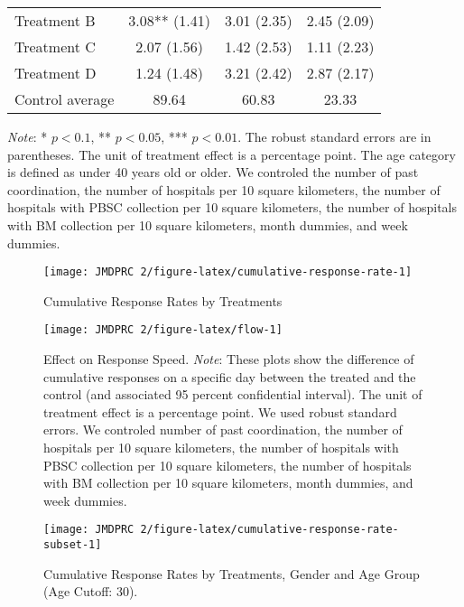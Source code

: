 \documentclass[12pt, a4paper]{article}
\begin{document}
\begin{table}[H]
\begin{threeparttable}
\begin{tabular}[t]{lccc}
\hspace{1em}Treatment B & 3.08** (1.41) & 3.01 (2.35) & 2.45 (2.09)\\
\hspace{1em}Treatment C & 2.07 (1.56) & 1.42 (2.53) & 1.11 (2.23)\\
\hspace{1em}Treatment D & 1.24 (1.48) & 3.21 (2.42) & 2.87 (2.17)\\
\hspace{1em}Control average & 89.64 & 60.83 & 23.33\\
\bottomrule
\end{tabular}
\begin{tablenotes}
\item \emph{Note}: * $p < 0.1$, ** $p < 0.05$, *** $p < 0.01$. The robust standard errors are in parentheses. The unit of treatment effect is a percentage point. The age category is defined as under 40 years old or older. We controled the number of past coordination, the number of hospitals per 10 square kilometers, the number of hospitals with PBSC collection per 10 square kilometers, the number of hospitals with BM collection per 10 square kilometers, month dummies, and week dummies.
\end{tablenotes}
\end{threeparttable}
\end{table}

\begin{figure}[H]
\texttt{[image: JMDPRC~2/figure-latex/cumulative-response-rate-1]} \caption{Cumulative Response Rates by Treatments}\label{fig:cumulative-response-rate}
\end{figure}

\begin{figure}[H]
\texttt{[image: JMDPRC~2/figure-latex/flow-1]} \caption{Effect on Response Speed. \newline \emph{Note}: These plots show the difference of cumulative responses on a specific day between the treated and the control (and associated 95 percent confidential interval). The unit of treatment effect is a percentage point. We used robust standard errors. We controled number of past coordination, the number of hospitals per 10 square kilometers, the number of hospitals with PBSC collection per 10 square kilometers, the number of hospitals with BM collection per 10 square kilometers, month dummies, and week dummies.}\label{fig:flow}
\end{figure}

\begin{figure}[H]
\texttt{[image: JMDPRC~2/figure-latex/cumulative-response-rate-subset-1]} \caption{Cumulative Response Rates by Treatments, Gender and Age Group (Age Cutoff: 30).}\label{fig:cumulative-response-rate-subset}
\end{figure}
\end{document}
